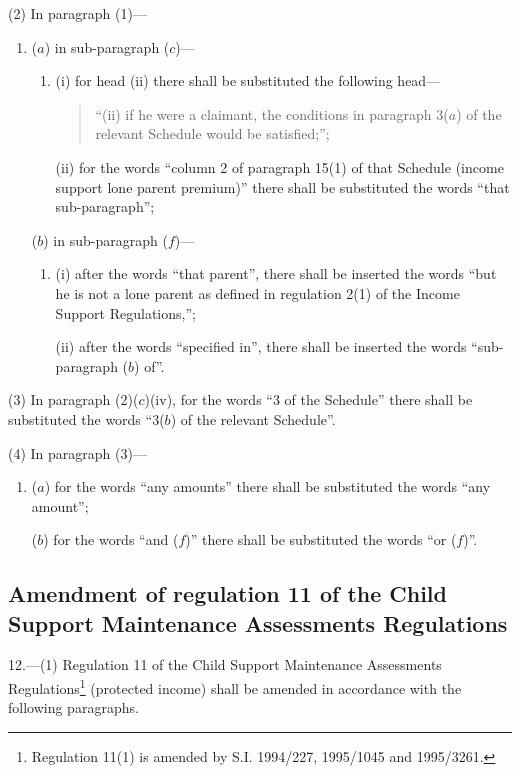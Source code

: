 \documentclass[a4paper]{article}
\begin{document}
(2) In paragraph (1)—
\begin{enumerate}\item[]
($a$) in sub-paragraph ($c$)—
\begin{enumerate}\item[]
(i) for head (ii) there shall be substituted the following head—
\begin{quotation}
“(ii) if he were a claimant, the conditions in paragraph 3($a$) of the relevant Schedule would be satisfied;”;
\end{quotation}

(ii) for the words “column 2 of paragraph 15(1) of that Schedule (income support lone parent premium)” there shall be substituted the words “that sub-paragraph”;
\end{enumerate}

($b$) in sub-paragraph ($f$)—
\begin{enumerate}\item[]
(i) after the words “that parent”, there shall be inserted the words “but he is not a lone parent as defined in regulation 2(1) of the Income Support Regulations,”;

(ii) after the words “specified in”, there shall be inserted the words “sub-paragraph ($b$) of”.
\end{enumerate}
\end{enumerate}

(3) In paragraph (2)($c$)(iv), for the words “3 of the Schedule” there shall be substituted the words “3($b$) of the relevant Schedule”.

(4) In paragraph (3)—
\begin{enumerate}\item[]
($a$) for the words “any amounts” there shall be substituted the words “any amount”;

($b$) for the words “and ($f$)” there shall be substituted the words “or ($f$)”.
\end{enumerate}

\subsection[12. Amendment of regulation 11 of the Child Support Maintenance Assessments Regulations]{\sloppy Amendment of regulation 11 of the Child Support Maintenance Assessments Regulations}

12.—(1) Regulation 11 of the Child Support Maintenance Assessments Regulations\footnote{\frenchspacing Regulation 11(1) is amended by S.I. 1994/227, 1995/1045 and 1995/3261.} (protected income) shall be amended in accordance with the following paragraphs.
\end{document}
